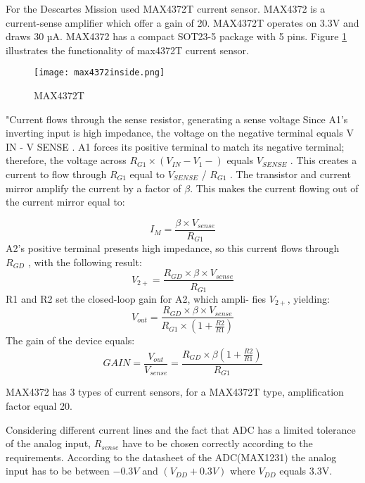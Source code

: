 For the Descartes Mission used MAX4372T current sensor. MAX4372 is a current-sense amplifier which offer a gain of 20. MAX4372T operates on 3.3V and draws 30 µA. MAX4372 has a compact SOT23-5 package with 5 pins. Figure \ref{fig: max4372t_inside} illustrates the functionality of max4372T current sensor.

 \begin{figure}[h]
 	\centering
 	\texttt{[image: max4372inside.png]}
 	\caption{MAX4372T \cite{24}}
 	\label{fig: max4372t_inside}
 \end{figure} 

\cite{23}"Current flows through the sense resistor, generating a
sense voltage  Since
A1’s inverting input is high impedance, the voltage on
the negative terminal equals V IN - V SENSE . A1 forces its
positive terminal to match its negative terminal; therefore,
the voltage across $R_{G1}\times (V_{IN} - V_{1}-)$ equals $V_{SENSE}$ . This
creates a current to flow through $R_{G1}$ equal to $V_{SENSE}$ /
$R_{G1}$ . The transistor and current mirror amplify the current
by a factor of $\beta$. This makes the current flowing out of the
current mirror equal to: 

 \begin{equation}
I_{M} = \frac{\beta \times V_{sense}}{R_{G1}}
 \end{equation}
 A2’s positive terminal presents high impedance, so this
 current flows through $R_{GD}$ , with the following result:
  \begin{equation}
V_{2+} = \frac{R_{GD} \times \beta \times V_{sense}}{R_{G1}}
  \end{equation}
  R1 and R2 set the closed-loop gain for A2, which ampli-
  fies $V_{2+}$, yielding:
  \begin{equation}
  V_{out} = \frac{R_{GD} \times \beta \times V_{sense}}{R_{G1} \times (1+\frac{R2}{R1})	 }
  \end{equation}
The gain of the device equals:
  \begin{equation}
  GAIN =\frac{V_{out}}{V_{sense}} = \frac{R_{GD} \times \beta (1+\frac{R2}{R1})}{R_{G1}}
  \end{equation}
  
  MAX4372 has 3 types of current sensors, for a MAX4372T type, amplification factor equal 20.
  
  Considering different current lines and the fact that ADC has a limited tolerance of the analog input, $R_{sense}$ have to be chosen correctly according to the requirements. According to the datasheet of the ADC(MAX1231) the analog input has to be between $ -0.3V$ and $(V_{DD} + 0.3V)$ where $V_{DD}$ equals 3.3V.
  
